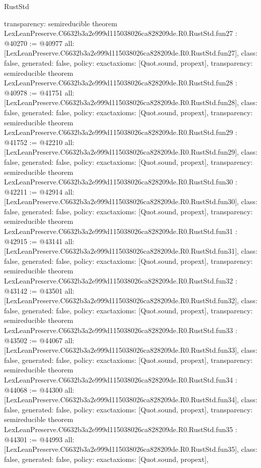 \begin{lexlean}{RustStd}
\begin{coremodule}
{  transparency: semireducible
}
theorem LexLeanPreserve.C6632b3a2e999d115038026ca828209de.R0.RustStd.fun27 : @40270 := @40977 {
  all: [LexLeanPreserve.C6632b3a2e999d115038026ca828209de.R0.RustStd.fun27],
  class: false,
  generated: false,
  policy: exact{axioms: [Quot.sound, propext]},
  transparency: semireducible
}
theorem LexLeanPreserve.C6632b3a2e999d115038026ca828209de.R0.RustStd.fun28 : @40978 := @41751 {
  all: [LexLeanPreserve.C6632b3a2e999d115038026ca828209de.R0.RustStd.fun28],
  class: false,
  generated: false,
  policy: exact{axioms: [Quot.sound, propext]},
  transparency: semireducible
}
theorem LexLeanPreserve.C6632b3a2e999d115038026ca828209de.R0.RustStd.fun29 : @41752 := @42210 {
  all: [LexLeanPreserve.C6632b3a2e999d115038026ca828209de.R0.RustStd.fun29],
  class: false,
  generated: false,
  policy: exact{axioms: [Quot.sound, propext]},
  transparency: semireducible
}
theorem LexLeanPreserve.C6632b3a2e999d115038026ca828209de.R0.RustStd.fun30 : @42211 := @42914 {
  all: [LexLeanPreserve.C6632b3a2e999d115038026ca828209de.R0.RustStd.fun30],
  class: false,
  generated: false,
  policy: exact{axioms: [Quot.sound, propext]},
  transparency: semireducible
}
theorem LexLeanPreserve.C6632b3a2e999d115038026ca828209de.R0.RustStd.fun31 : @42915 := @43141 {
  all: [LexLeanPreserve.C6632b3a2e999d115038026ca828209de.R0.RustStd.fun31],
  class: false,
  generated: false,
  policy: exact{axioms: [Quot.sound, propext]},
  transparency: semireducible
}
theorem LexLeanPreserve.C6632b3a2e999d115038026ca828209de.R0.RustStd.fun32 : @43142 := @43501 {
  all: [LexLeanPreserve.C6632b3a2e999d115038026ca828209de.R0.RustStd.fun32],
  class: false,
  generated: false,
  policy: exact{axioms: [Quot.sound, propext]},
  transparency: semireducible
}
theorem LexLeanPreserve.C6632b3a2e999d115038026ca828209de.R0.RustStd.fun33 : @43502 := @44067 {
  all: [LexLeanPreserve.C6632b3a2e999d115038026ca828209de.R0.RustStd.fun33],
  class: false,
  generated: false,
  policy: exact{axioms: [Quot.sound, propext]},
  transparency: semireducible
}
theorem LexLeanPreserve.C6632b3a2e999d115038026ca828209de.R0.RustStd.fun34 : @44068 := @44300 {
  all: [LexLeanPreserve.C6632b3a2e999d115038026ca828209de.R0.RustStd.fun34],
  class: false,
  generated: false,
  policy: exact{axioms: [Quot.sound, propext]},
  transparency: semireducible
}
theorem LexLeanPreserve.C6632b3a2e999d115038026ca828209de.R0.RustStd.fun35 : @44301 := @44993 {
  all: [LexLeanPreserve.C6632b3a2e999d115038026ca828209de.R0.RustStd.fun35],
  class: false,
  generated: false,
  policy: exact{axioms: [Quot.sound, propext]},
}
\end{coremodule}
\end{lexlean}

